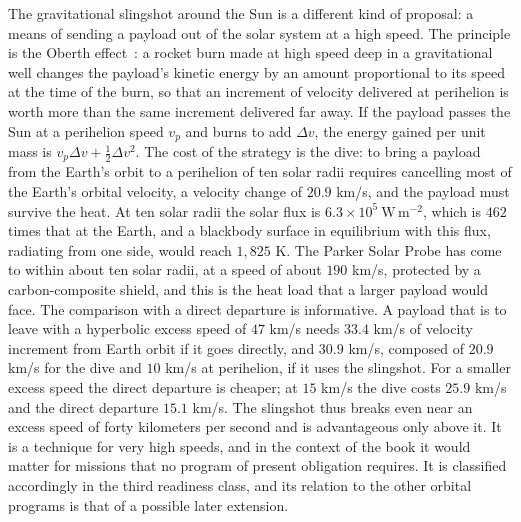 The gravitational slingshot around the Sun is a different kind of proposal: a means of sending a payload out of the solar system at a high speed. The principle is the Oberth effect~\cite{oberth1929}: a rocket burn made at high speed deep in a gravitational well changes the payload's kinetic energy by an amount proportional to its speed at the time of the burn, so that an increment of velocity delivered at perihelion is worth more than the same increment delivered far away. If the payload passes the Sun at a perihelion speed $v_p$ and burns to add $\Delta v$, the energy gained per unit mass is $v_p\Delta v+\tfrac12\Delta v^2$. The cost of the strategy is the dive: to bring a payload from the Earth's orbit to a perihelion of ten solar radii requires cancelling most of the Earth's orbital velocity, a velocity change of $20.9$ km/s, and the payload must survive the heat. At ten solar radii the solar flux is $6.3\times10^5\ \mathrm{W\,m^{-2}}$, which is $462$ times that at the Earth, and a blackbody surface in equilibrium with this flux, radiating from one side, would reach $1{,}825$ K. The Parker Solar Probe has come to within about ten solar radii, at a speed of about $190$ km/s, protected by a carbon-composite shield, and this is the heat load that a larger payload would face. The comparison with a direct departure is informative. A payload that is to leave with a hyperbolic excess speed of $47$ km/s needs $33.4$ km/s of velocity increment from Earth orbit if it goes directly, and $30.9$ km/s, composed of $20.9$ km/s for the dive and $10$ km/s at perihelion, if it uses the slingshot. For a smaller excess speed the direct departure is cheaper; at $15$ km/s the dive costs $25.9$ km/s and the direct departure $15.1$ km/s. The slingshot thus breaks even near an excess speed of forty kilometers per second and is advantageous only above it. It is a technique for very high speeds, and in the context of the book it would matter for missions that no program of present obligation requires. It is classified accordingly in the third readiness class, and its relation to the other orbital programs is that of a possible later extension.

